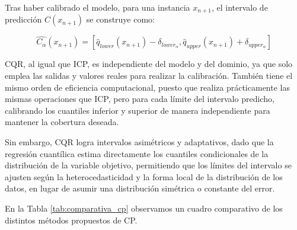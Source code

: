 Tras haber calibrado el modelo, para una instancia $x_{n+1}$, el intervalo de predicción $C(x_{n+1})$ se
construye como:

$$
\hat{C_\alpha}(x_{n+1}) = 
        \left[ 
            \hat{q}_{lower}(x_{n+1}) - \delta_{lower_\alpha}, 
            \hat{q}_{upper}(x_{n+1}) + \delta_{upper_\alpha}
        \right]
$$

CQR, al igual que ICP, es independiente del modelo y del dominio, ya que solo emplea las salidas y valores reales para realizar la calibración. También tiene el mismo orden de eficiencia computacional, puesto que realiza prácticamente las mismas operaciones que ICP, pero para cada límite del intervalo predicho, calibrando los cuantiles inferior y superior de manera independiente para mantener la cobertura deseada.

Sin embargo, CQR logra intervalos asimétricos y adaptativos, dado que la regresión cuantílica estima directamente los cuantiles condicionales de la distribución de la variable objetivo, permitiendo que los límites del intervalo se ajusten según la heterocedasticidad y la forma local de la distribución de los datos, en lugar de asumir una distribución simétrica o constante del error. 

En la Tabla \ref{tab:comparativa_cp} observamos un cuadro comparativo de los distintos métodos propuestos de CP. 

